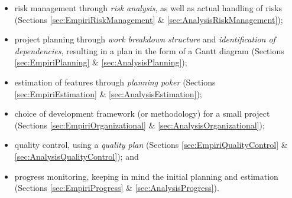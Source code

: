 \begin{itemize} \item risk management through \emph{risk analysis}, as well as
		actual handling of risks (Sections
	\ref{sec:EmpiriRiskManagement} \& \ref{sec:AnalysisRiskManagement});
	\item project planning through \emph{work breakdown structure} and
		\emph{identification of dependencies}, resulting in a plan in
	the form of a Gantt diagram (Sections \ref{sec:EmpiriPlanning} \&
	\ref{sec:AnalysisPlanning}); \item estimation of features through
		\emph{planning poker} (Sections \ref{sec:EmpiriEstimation} \&
		\ref{sec:AnalysisEstimation}); \item choice of development
		framework (or methodology) for a small project (Sections
	\ref{sec:EmpiriOrganizational} \& \ref{sec:AnalysisOrganizational});
	\item quality control, using a \emph{quality plan} (Sections
		\ref{sec:EmpiriQualityControl} \&
		\ref{sec:AnalysisQualityControl}); and \item progress
	monitoring, keeping in mind the initial planning and estimation
	(Sections \ref{sec:EmpiriProgress} \& \ref{sec:AnalysisProgress}).
	\end{itemize}
